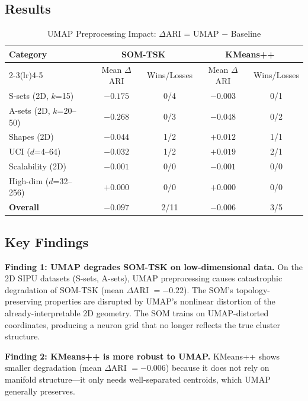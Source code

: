 \documentclass[journal]{IEEEtran}
\begin{document}
\subsection{Results}

\begin{table}[!t]
\caption{UMAP Preprocessing Impact: $\Delta$ARI = UMAP $-$ Baseline}
\label{tab:umap}
\centering
\renewcommand{\arraystretch}{1.05}
\small
\setlength{\tabcolsep}{3pt}
\begin{tabular}{lcccc}
\toprule
\multirow{2}{*}{Category} & \multicolumn{2}{c}{SOM-TSK} & \multicolumn{2}{c}{KMeans++} \\
\cmidrule(lr){2-3}\cmidrule(lr){4-5}
 & Mean $\Delta$ARI & Wins/Losses & Mean $\Delta$ARI & Wins/Losses \\
\midrule
S-sets (2D, $k$=15) & $-0.175$ & 0/4 & $-0.003$ & 0/1 \\
A-sets (2D, $k$=20--50) & $-0.268$ & 0/3 & $-0.048$ & 0/2 \\
Shapes (2D) & $-0.044$ & 1/2 & $+0.012$ & 1/1 \\
UCI ($d$=4--64) & $-0.032$ & 1/2 & $+0.019$ & 2/1 \\
Scalability (2D) & $-0.001$ & 0/0 & $-0.001$ & 0/0 \\
High-dim ($d$=32--256) & $+0.000$ & 0/0 & $+0.000$ & 0/0 \\
\midrule
\textbf{Overall} & $\mathbf{-0.097}$ & 2/11 & $\mathbf{-0.006}$ & 3/5 \\
\bottomrule
\end{tabular}
\end{table}

\subsection{Key Findings}

\textbf{Finding 1: UMAP degrades SOM-TSK on low-dimensional data.} On the 2D SIPU datasets (S-sets, A-sets), UMAP preprocessing causes catastrophic degradation of SOM-TSK (mean $\Delta$ARI $= -0.22$). The SOM's topology-preserving properties are disrupted by UMAP's nonlinear distortion of the already-interpretable 2D geometry. The SOM trains on UMAP-distorted coordinates, producing a neuron grid that no longer reflects the true cluster structure.

\textbf{Finding 2: KMeans++ is more robust to UMAP.} KMeans++ shows smaller degradation (mean $\Delta$ARI $= -0.006$) because it does not rely on manifold structure---it only needs well-separated centroids, which UMAP generally preserves.
\end{document}
